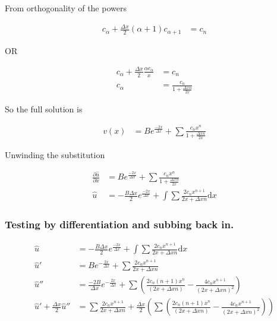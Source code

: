 \documentclass[a4paper]{article}
\begin{document}
From orthogonality of the powers

\begin{align*}
c_{\alpha } + \frac{\Delta x}{2} ( \alpha + 1 ) c_{\alpha + 1 } & = c _n
\end{align*}

OR 

\begin{align*}
c _\alpha + \frac{\Delta x }{2} \frac{\alpha c_\alpha }{x} & = c_n \\
c_\alpha & = \frac{c_n}{1 + \frac{\Delta x \alpha }{2x}}
\end{align*}

So the full solution is 

\begin{align*}
v ( x) & = B e^{\frac{-2 x}{\Delta x} } + \sum \frac{c_n x ^n }{1 + \frac{\Delta x n}{2 x}} 
\end{align*}

Unwinding the substitution 

\begin{align*}
\frac{\partial \hat{u}}{\partial x } & = B e^{\frac{-2 x}{\Delta x} } + \sum \frac{c_n x ^n }{1 + \frac{\Delta x n}{2 x}} \\
\hat{u} & =  - \frac{B \Delta x}{2} e^{\frac{-2 x}{\Delta x} } + \int \sum	 \frac{2 c_n x^{n+1}}{2x + \Delta x n } \mathrm{d} x
\end{align*}

\subsubsection*{Testing by differentiation and subbing back in. }

\begin{align*}
\hat{u} & =  - \frac{B \Delta x}{2} e^{\frac{-2 x}{\Delta x} } + \int \sum	 \frac{2 c_n x^{n+1}}{2x + \Delta x n } \mathrm{d} x \\
\hat{u} ' & = B e ^{- \frac{2x}{\Delta x }} + \sum	 \frac{2 c_n x^{n+1}}{2x + \Delta x n } \\
\hat{u} '' & = \frac{- 2 B }{\Delta x} e ^{- \frac{2x}{\Delta x }} + \sum \left( \frac{2 c_n (n+1) x^n}{(2x + \Delta x n)} - \frac{4 c_n x^{n+1}}{(2 x + \Delta x n )^2}  \right) \\
\hat{u} ' + \frac{\Delta x}{2} \hat{u} '' & = \sum	 \frac{2 c_n x^{n+1}}{2x + \Delta x n } + \frac{\Delta x}{2} \left( \sum \left( \frac{2 c_n (n+1) x^n}{(2x + \Delta x n)} - \frac{4 c_n x^{n+1}}{(2 x + \Delta x n )^2}  \right) \right) \\
\end{align*}
\end{document}
